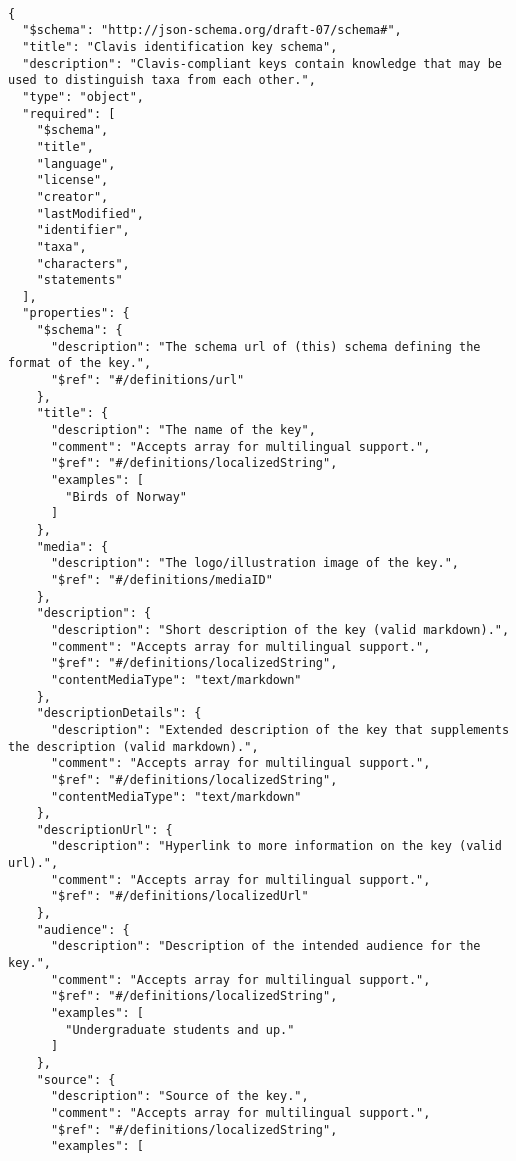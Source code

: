 \documentclass[10pt,letterpaper]{article}
\begin{document}
\vspace*{0.2in}

\begin{flushleft}
{\Large
\textbf{}}
\newline
\end{flushleft}
\linenumbers
\begin{verbatim}

{
  "$schema": "http://json-schema.org/draft-07/schema#",
  "title": "Clavis identification key schema",
  "description": "Clavis-compliant keys contain knowledge that may be
used to distinguish taxa from each other.",
  "type": "object",
  "required": [
    "$schema",
    "title",
    "language",
    "license",
    "creator",
    "lastModified",
    "identifier",
    "taxa",
    "characters",
    "statements"
  ],
  "properties": {
    "$schema": {
      "description": "The schema url of (this) schema defining the
format of the key.",
      "$ref": "#/definitions/url"
    },
    "title": {
      "description": "The name of the key",
      "comment": "Accepts array for multilingual support.",
      "$ref": "#/definitions/localizedString",
      "examples": [
        "Birds of Norway"
      ]
    },
    "media": {
      "description": "The logo/illustration image of the key.",
      "$ref": "#/definitions/mediaID"
    },
    "description": {
      "description": "Short description of the key (valid markdown).",
      "comment": "Accepts array for multilingual support.",
      "$ref": "#/definitions/localizedString",
      "contentMediaType": "text/markdown"
    },
    "descriptionDetails": {
      "description": "Extended description of the key that supplements
the description (valid markdown).",
      "comment": "Accepts array for multilingual support.",
      "$ref": "#/definitions/localizedString",
      "contentMediaType": "text/markdown"
    },
    "descriptionUrl": {
      "description": "Hyperlink to more information on the key (valid
url).",
      "comment": "Accepts array for multilingual support.",
      "$ref": "#/definitions/localizedUrl"
    },
    "audience": {
      "description": "Description of the intended audience for the
key.",
      "comment": "Accepts array for multilingual support.",
      "$ref": "#/definitions/localizedString",
      "examples": [
        "Undergraduate students and up."
      ]
    },
    "source": {
      "description": "Source of the key.",
      "comment": "Accepts array for multilingual support.",
      "$ref": "#/definitions/localizedString",
      "examples": [

\end{verbatim}
\end{document}
